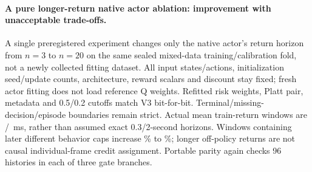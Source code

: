 \documentclass[10pt]{article}
\begin{document}
\paragraph{A pure longer-return native actor ablation: improvement with unacceptable trade-offs.}
A single preregistered experiment changes only the native actor's return horizon from $n=3$ to $n=20$ on the same sealed mixed-data training/calibration fold, not a newly collected fitting dataset. All input states/actions, initialization seed/update counts, architecture, reward scalars and discount stay fixed; fresh actor fitting does not load reference Q weights. Refitted risk weights, Platt pair, metadata and 0.5/0.2 cutoffs match V3 bit-for-bit. Terminal/missing-decision/episode boundaries remain strict. Actual mean train-return windows are \NativeTemporalWindowThree{} / \NativeTemporalWindowTwenty{}\,ms, rather than assumed exact 0.3/2-second horizons. Windows containing later different behavior caps increase \NativeTemporalMixtureThree{}\% to \NativeTemporalMixtureTwenty{}\%; longer off-policy returns are not causal individual-frame credit assignment. Portable parity again checks 96 histories in each of three gate branches.
\end{document}
